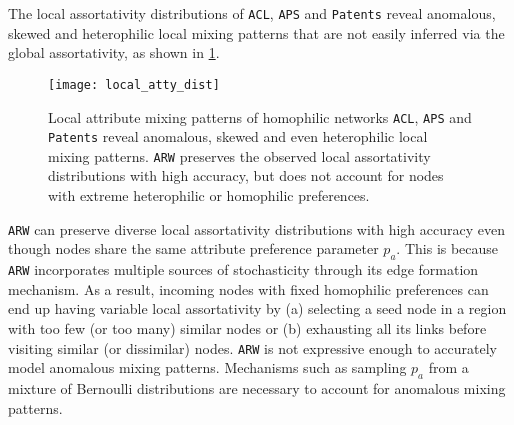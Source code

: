 The local assortativity distributions
of \texttt{ACL}, \texttt{APS} and \texttt{Patents} reveal anomalous, skewed
and heterophilic local mixing patterns that are not easily inferred via the global assortativity,
as shown in \cref{fig:local_atty}.
\begin{figure}
	\centering
	\texttt{[image: local\_atty\_dist]}
	\caption{Local attribute mixing patterns of homophilic networks \texttt{ACL}, \texttt{APS}
		and \texttt{Patents} reveal anomalous, skewed and even heterophilic local mixing patterns.
		\texttt{ARW} preserves the observed local assortativity distributions with high accuracy,
	but does not account for nodes with extreme heterophilic or homophilic preferences.}
	\label{fig:local_atty}
\end{figure}
\texttt{ARW} can preserve
diverse local assortativity distributions with high accuracy even though nodes
share the same attribute preference parameter $p_a$. This is because  \texttt{ARW}
incorporates multiple sources of stochasticity through its edge formation
mechanism. As a result, incoming nodes with fixed homophilic preferences can end
up having variable local assortativity by (a) selecting a seed node in a region
with too few (or too many) similar nodes or (b) exhausting all its links before
visiting similar (or dissimilar) nodes.
\texttt{ARW} is not expressive enough to accurately model anomalous
mixing patterns. Mechanisms such as sampling $p_a$ from a mixture of
Bernoulli distributions are necessary to account for anomalous mixing patterns.



%
%


























